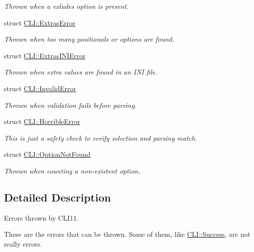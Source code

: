 \begin{DoxyCompactItemize}
\begin{DoxyCompactList}\small\item\em Thrown when a exludes option is present. \end{DoxyCompactList}\item 
struct \mbox{\hyperlink{struct_c_l_i_1_1_extras_error}{C\+L\+I\+::\+Extras\+Error}}
\begin{DoxyCompactList}\small\item\em Thrown when too many positionals or options are found. \end{DoxyCompactList}\item 
struct \mbox{\hyperlink{struct_c_l_i_1_1_extras_i_n_i_error}{C\+L\+I\+::\+Extras\+I\+N\+I\+Error}}
\begin{DoxyCompactList}\small\item\em Thrown when extra values are found in an I\+NI file. \end{DoxyCompactList}\item 
struct \mbox{\hyperlink{struct_c_l_i_1_1_invalid_error}{C\+L\+I\+::\+Invalid\+Error}}
\begin{DoxyCompactList}\small\item\em Thrown when validation fails before parsing. \end{DoxyCompactList}\item 
struct \mbox{\hyperlink{struct_c_l_i_1_1_horrible_error}{C\+L\+I\+::\+Horrible\+Error}}
\begin{DoxyCompactList}\small\item\em This is just a safety check to verify selection and parsing match. \end{DoxyCompactList}\item 
struct \mbox{\hyperlink{struct_c_l_i_1_1_option_not_found}{C\+L\+I\+::\+Option\+Not\+Found}}
\begin{DoxyCompactList}\small\item\em Thrown when counting a non-\/existent option. \end{DoxyCompactList}\end{DoxyCompactItemize}


\subsection{Detailed Description}
Errors thrown by C\+L\+I11. 

These are the errors that can be thrown. Some of them, like \mbox{\hyperlink{struct_c_l_i_1_1_success}{C\+L\+I\+::\+Success}}, are not really errors. 